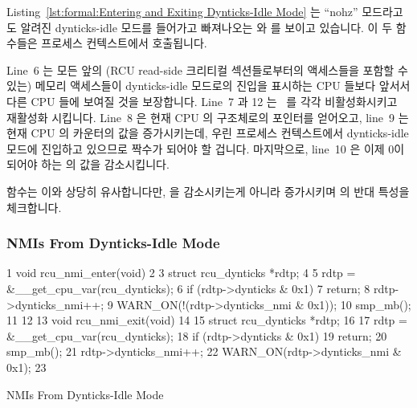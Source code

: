 Listing~\ref{lst:formal:Entering and Exiting Dynticks-Idle Mode}
는 ``nohz'' 모드라고도 알려진 dynticks-idle 모드를 들어가고 빠져나오는
 와  를 보이고 있습니다.
이 두 함수들은 프로세스 컨텍스트에서 호출됩니다.

Line~6 는 모든 앞의 (RCU read-side 크리티컬 섹션들로부터의 액세스들을 포함할 수
있는) 메모리 액세스들이 dynticks-idle 모드로의 진입을 표시하는 CPU 들보다
앞서서 다른 CPU 들에 보여질 것을 보장합니다.
Line~7 과 12 는 \IRQ\ 를 각각 비활성화시키고 재활성화 시킵니다.
Line~8 은 현재 CPU 의  구조체로의 포인터를 얻어오고, line~9 는
현재 CPU 의  카운터의 값을 증가시키는데, 우린 프로세스
컨텍스트에서 dynticks-idle 모드에 진입하고 있으므로 짝수가 되어야 할 겁니다.
마지막으로, line~10 은 이제 0이 되어야 하는  의 값을
감소시킵니다.

 함수는 이와 상당히 유사합니다만,  을
감소시키는게 아니라 증가시키며  의 반대 특성을 체크합니다.
\iffalse

Listing~\ref{lst:formal:Entering and Exiting Dynticks-Idle Mode}
shows the \co{rcu_enter_nohz()} and \co{rcu_exit_nohz()},
which enter and exit dynticks-idle mode, also known as ``nohz'' mode.
These two functions are invoked from process context.

Line~6 ensures that any prior memory accesses (which might
include accesses from RCU read-side critical sections) are seen
by other CPUs before those marking entry to dynticks-idle mode.
Lines~7 and~12 disable and reenable \IRQ s.
Line~8 acquires a pointer to the current CPU's \co{rcu_dynticks}
structure, and
line~9 increments the current CPU's \co{dynticks} counter, which
should now be even, given that we are entering dynticks-idle mode
in process context.
Finally, line~10 decrements \co{dynticks_nesting}, which should now be zero.

The \co{rcu_exit_nohz()} function is quite similar, but increments
\co{dynticks_nesting} rather than decrementing it and checks for
the opposite \co{dynticks} polarity.
\fi

\subsubsection{NMIs From Dynticks-Idle Mode}
\label{sec:formal:NMIs From Dynticks-Idle Mode}

\begin{listing}[tbp]
{ \scriptsize
\begin{verbbox}
 1  void rcu_nmi_enter(void)
 2  {
 3    struct rcu_dynticks *rdtp;
 4 
 5    rdtp = &__get_cpu_var(rcu_dynticks);
 6    if (rdtp->dynticks & 0x1)
 7      return;
 8    rdtp->dynticks_nmi++;
 9    WARN_ON(!(rdtp->dynticks_nmi & 0x1));
10    smp_mb();
11  }
12 
13  void rcu_nmi_exit(void)
14  {
15    struct rcu_dynticks *rdtp;
16 
17    rdtp = &__get_cpu_var(rcu_dynticks);
18    if (rdtp->dynticks & 0x1)
19      return;
20    smp_mb();
21    rdtp->dynticks_nmi++;
22    WARN_ON(rdtp->dynticks_nmi & 0x1);
23  }
\end{verbbox}
}
\centering
\theverbbox
\caption{NMIs From Dynticks-Idle Mode}
\label{lst:formal:NMIs From Dynticks-Idle Mode}
\end{listing}

